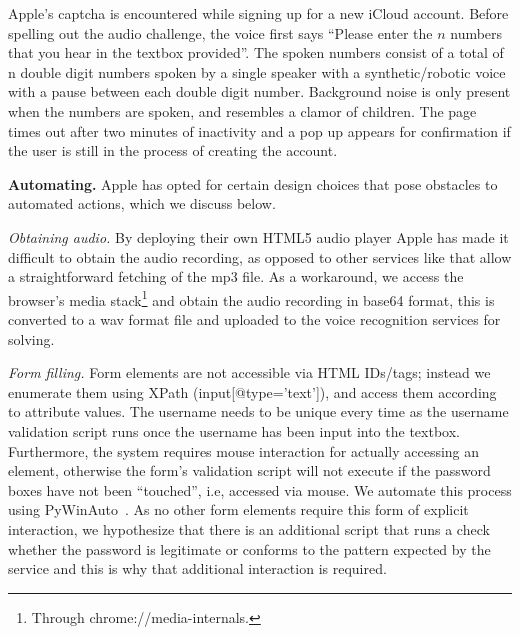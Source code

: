 Apple's captcha is encountered while signing up for a new iCloud account.
Before spelling out the audio challenge,
the voice first says ``Please enter the $n$ numbers that you hear in the textbox provided''. The 
spoken numbers consist of a total of n double digit numbers spoken by a single speaker with a synthetic/robotic voice with a pause between each double digit number.
Background noise is only present when the numbers are spoken,
and resembles a clamor of children.
The page times out after two minutes of inactivity and a pop up appears for confirmation if the user is 
still in the process of creating the account. 


\textbf{Automating.} Apple has opted for certain design choices that pose obstacles to automated actions,
which we discuss below.

\emph{Obtaining audio.} By deploying their own HTML5 audio player Apple has made it 
difficult to obtain the audio recording, as opposed to other services like \re
that allow a straightforward fetching of the mp3 file. As a workaround, we access 
the browser's media stack\footnote{Through chrome://media-internals.} and obtain the 
audio recording in base64 format, this is converted to a wav format file and uploaded to the voice recognition services for solving. 

\emph{Form filling.} Form elements are not accessible via HTML IDs/tags; instead we enumerate them 
using XPath (input[@type='text']), and access them according to attribute values. The username needs to be 
unique every time as the username validation script runs once the username has been input into the textbox.
Furthermore, the system requires mouse interaction for actually accessing an element, otherwise the 
form's validation script will not execute if the password boxes have not been ``touched'',  i.e, accessed via mouse. We automate this
process using PyWinAuto~\cite{pywinauto}. As no other form elements require this form of explicit interaction,
we hypothesize that there is an additional script that runs a check whether the password is legitimate or conforms 
to the pattern expected by the service and this is why that additional interaction is required.

